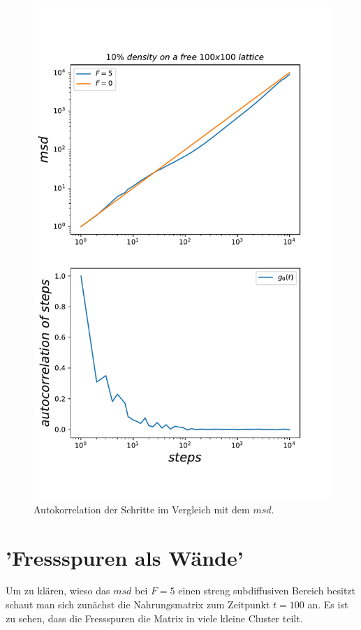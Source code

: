 \documentclass[a4paper, 12pt]{report}
\begin{document}
\begin{figure}[h!]
	\centering
	\includegraphics[scale=0.75]{autocorr.pdf}
	\caption{Autokorrelation der Schritte im Vergleich mit dem $msd$.}
\end{figure}

\clearpage

\section{'Fressspuren als Wände'}
Um zu klären, wieso das $msd$ bei $F=5$ einen streng subdiffusiven Bereich besitzt schaut man sich zunächst die Nahrungsmatrix zum Zeitpunkt $t=100$ an. Es ist zu sehen, dass die Fressspuren die Matrix in viele kleine Cluster teilt. 
\end{document}
